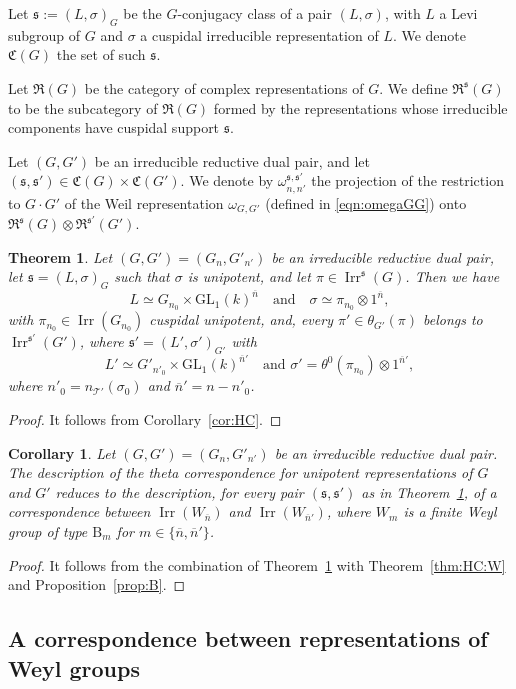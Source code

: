 \documentclass[12pt]{amsart}
\numberwithin{equation}{subsection}
\newtheorem{cor}[equation]{Corollary}
\newtheorem{thm}[equation]{Theorem}
\newcommand{\cT}{\mathcal{T}}
\newcommand{\fR}{\mathfrak{R}}
\newcommand{\fs}{\mathfrak{s}}
\newcommand{\fC}{\mathfrak{C}}
\newcommand{\Irr}{\operatorname{Irr}}
\newcommand{\GL}{\mathrm{GL}}
\def\rB{{\mathrm{B}}}
\def\cT{{\mathcal{T}}}
\begin{document}
Let $\fs:=(L,\sigma)_G$ be the $G$-conjugacy class of a pair $(L,\sigma)$, with $L$ a Levi subgroup of $G$ and $\sigma$ a cuspidal irreducible representation of $L$. We denote $\fC(G)$ the set of such $\fs$. 

Let $\fR(G)$ be the category of complex representations of $G$. We define $\fR^\fs(G)$ to be the subcategory of $\fR(G)$ formed by the representations whose irreducible components have cuspidal support $\fs$.

Let $(G,G')$ be an irreducible reductive dual pair, and let $(\fs,\fs')\in\fC(G)\times\fC(G')$. We denote by $\omega_{n,n'}^{\fs,\fs'}$ the projection of the  restriction to $G\cdot G'$ of the Weil representation $\omega_{G,G'}$
(defined in \eqref{eqn:omegaGG}) onto $\fR^\fs(G)\otimes\fR^{\fs'}(G')$.

\begin{thm} \label{thm:HC-unip}
Let $(G,G')=(G_n,G'_{n'})$ be an irreducible reductive dual pair, let $\fs=(L,\sigma)_G$ such that $\sigma$ is unipotent, and let $\pi\in\Irr^\fs(G)$. 
Then we have
\[L\simeq G_{n_0}\times \GL_{1}(k)^{\overline{n}}\quad\text{and}\quad \sigma\simeq \pi_{n_0}\otimes 1^{\overline{n}},\]
with $\pi_{n_0}\in\Irr(G_{n_0})$ cuspidal unipotent,
and, every $\pi'\in\theta_{G'}(\pi)$ belongs to $\Irr^{\fs'}(G')$, where $\fs'=(L',\sigma')_{G'}$ with
\[L'\simeq G'_{n'_0}\times \GL_{1}(k)^{\overline{n}'}\quad\text{and $\sigma'=\theta^0(\pi_{n_0})\otimes 1^{\overline{n}'}$},\]
where $n'_0=n_{\cT'}(\sigma_0)$ and $\overline{n}'=n-n'_0$.
\end{thm}
\begin{proof}
It follows from Corollary~\ref{cor:HC}.
\end{proof}

\begin{cor} \label{cor:Theta-WW}
Let $(G,G')=(G_n,G'_{n'})$ be an irreducible  reductive dual pair. The description of the theta correspondence for unipotent representations of $G$ and $G'$ reduces to the description, for every pair 
$(\fs,\fs')$ as in  Theorem~\ref{thm:HC-unip}, of a correspondence between $\Irr(W_{\overline{n}})$ and $\Irr(W_{\overline{n}'})$, where $W_m$ is a finite Weyl group of type $\rB_m$ for $m\in\{\overline{n},\overline{n}'\}$.
\end{cor}
\begin{proof}
It follows from the combination of Theorem~\ref{thm:HC-unip} with Theorem~\ref{thm:HC:W} and Proposition~\ref{prop:B}.
\end{proof}

\subsection{A correspondence between representations of Weyl groups} \label{subsec:WW}\
\end{document}

